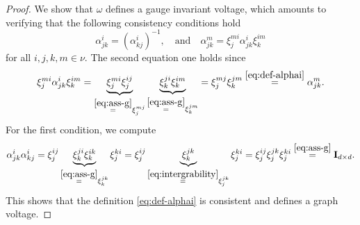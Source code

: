 \documentclass[10pt,reqno]{amsart}
\numberwithin{equation}{section}
\theoremstyle{bfnote}
\theoremstyle{bfdef}
\newcommand{\II}{\mathbf{I}_{d \times d}}
\begin{document}
	\begin{proof}
		We show that $\omega$ defines a gauge invariant voltage, which amounts to verifying that the following consistency conditions hold
		\begin{equation}
			\alpha_{jk}^{i} = (\alpha_{kj}^{i})^{-1}, \quad \text{and} \quad
			\alpha_{jk}^{m} = \xi^{mi}_{j} \alpha^{i}_{jk} \xi^{im}_{k}
		\end{equation}
		for all $i,j,k,m \in \nu$. The second equation one holds since
		\begin{equation}
			\xi^{mi}_{j} \alpha^{i}_{jk} \xi^{im}_{k}
			=
			\underbrace{\xi^{mi}_{j} \xi^{ij}_{j}}_{\overset{\eqref{eq:ass-g}}{=}\xi^{mj}_{j}}
			\underbrace{\xi^{ji}_{k} \xi^{im}_{k}}_{\overset{\eqref{eq:ass-g}}{=}\xi^{jm}_{k}}
			= \xi^{mj}_{j} \xi^{jm}_{k}
			\overset{\eqref{eq:def-alphai}}{=} \alpha^{m}_{jk}.
		\end{equation}
		For the first condition, we compute
		\begin{equation}
			\alpha^{i}_{jk}\alpha^{i}_{kj}
			=
			\xi^{ij}_{j}
			\underbrace{
				\xi^{ji}_{k}\xi^{ik}_{k}
			}_{\overset{\eqref{eq:ass-g}}{=} \xi^{jk}_{k}}
			\xi^{ki}_{j}
			=
			\xi^{ij}_{j}
			\underbrace{
				\xi^{jk}_{k}
			}_{\overset{\eqref{eq:intergrability}}{=} \xi^{jk}_{j}}
			\xi^{ki}_{j}
			=
			\xi^{ij}_{j}\xi^{jk}_{j}\xi^{ki}_{j}
			\overset{\eqref{eq:ass-g}}{=}
			\II.
		\end{equation}
		This shows that the definition \eqref{eq:def-alphai} is consistent and defines a graph voltage.


\end{proof}
\end{document}
